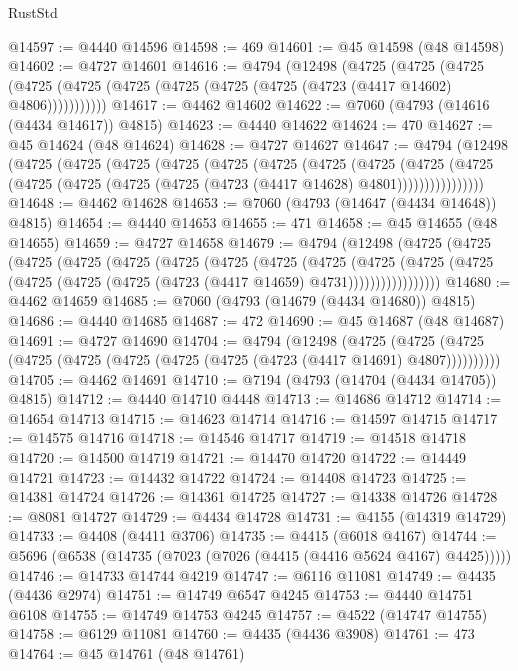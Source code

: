 \begin{lexlean}{RustStd}
\begin{coremodule}
{\begin{coremodule}
{{{{{{{{{{{{{{{{{{{{{{{{{{{{{{{{{{{{{{{{{{{{{{{{{{{{{{{{{{{{@14597 := @4440 @14596
@14598 := 469
@14601 := @45 @14598 (@48 @14598)
@14602 := @4727 @14601
@14616 := @4794
    (@12498
      (@4725
        (@4725
          (@4725 (@4725 (@4725 (@4725 (@4725 (@4725 (@4725 (@4723 (@4417 @14602) @4806)))))))))))
@14617 := @4462 @14602
@14622 := @7060 (@4793 (@14616 (@4434 @14617)) @4815)
@14623 := @4440 @14622
@14624 := 470
@14627 := @45 @14624 (@48 @14624)
@14628 := @4727 @14627
@14647 := @4794
    (@12498
      (@4725
        (@4725
          (@4725
            (@4725
              (@4725
                (@4725
                  (@4725
                    (@4725
                      (@4725
                        (@4725
                          (@4725 (@4725 (@4725 (@4725 (@4723 (@4417 @14628) @4801))))))))))))))))
@14648 := @4462 @14628
@14653 := @7060 (@4793 (@14647 (@4434 @14648)) @4815)
@14654 := @4440 @14653
@14655 := 471
@14658 := @45 @14655 (@48 @14655)
@14659 := @4727 @14658
@14679 := @4794
    (@12498
      (@4725
        (@4725
          (@4725
            (@4725
              (@4725
                (@4725
                  (@4725
                    (@4725
                      (@4725
                        (@4725
                          (@4725
                            (@4725 (@4725 (@4725 (@4725 (@4723 (@4417 @14659) @4731)))))))))))))))))
@14680 := @4462 @14659
@14685 := @7060 (@4793 (@14679 (@4434 @14680)) @4815)
@14686 := @4440 @14685
@14687 := 472
@14690 := @45 @14687 (@48 @14687)
@14691 := @4727 @14690
@14704 := @4794
    (@12498
      (@4725 (@4725 (@4725 (@4725 (@4725 (@4725 (@4725 (@4725 (@4723 (@4417 @14691) @4807))))))))))
@14705 := @4462 @14691
@14710 := @7194 (@4793 (@14704 (@4434 @14705)) @4815)
@14712 := @4440 @14710 @4448
@14713 := @14686 @14712
@14714 := @14654 @14713
@14715 := @14623 @14714
@14716 := @14597 @14715
@14717 := @14575 @14716
@14718 := @14546 @14717
@14719 := @14518 @14718
@14720 := @14500 @14719
@14721 := @14470 @14720
@14722 := @14449 @14721
@14723 := @14432 @14722
@14724 := @14408 @14723
@14725 := @14381 @14724
@14726 := @14361 @14725
@14727 := @14338 @14726
@14728 := @8081 @14727
@14729 := @4434 @14728
@14731 := @4155 (@14319 @14729)
@14733 := @4408 (@4411 @3706)
@14735 := @4415 (@6018 @4167)
@14744 := @5696 (@6538 (@14735 (@7023 (@7026 (@4415 (@4416 @5624 @4167) @4425)))))
@14746 := @14733 @14744 @4219
@14747 := @6116 @11081
@14749 := @4435 (@4436 @2974)
@14751 := @14749 @6547 @4245
@14753 := @4440 @14751 @6108
@14755 := @14749 @14753 @4245
@14757 := @4522 (@14747 @14755)
@14758 := @6129 @11081
@14760 := @4435 (@4436 @3908)
@14761 := 473
@14764 := @45 @14761 (@48 @14761)
}}}}}}}}}}}}}}}}}}}}}}}}}}}}}}}}}}}}}}}}}}}}}}}}}}}}}}}}}}}}
\end{coremodule}}
\end{coremodule}
\end{lexlean}
